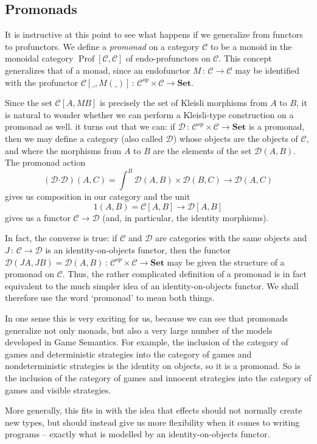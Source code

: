 \documentclass{svproc}
\newcommand\C{\mathcal{C}}
\newcommand\D{\mathcal{D}}
\newcommand\from{\,\colon\,}
\newcommand{\pfc}{\boldsymbol{\cdot}}
\newcommand{\catname}[1]{\mathbf{#1}}
\newcommand{\Set}{\catname{Set}}
\DeclareMathOperator{\Prof}{Prof}
\begin{document}
\subsection{Promonads}

It is instructive at this point to see what happens if we generalize from functors to profunctors.  
We define a \emph{promonad} on a category $\C$ to be a monoid in the monoidal category $\Prof[\C,\C]$ of endo-profunctors on $\C$.  
This concept generalizes that of a monad, since an endofunctor $M\from \C\to\C$ may be identified with the profunctor $\C[\_,M(\_)]\from \C^{op}\times\C\to\Set$.

Since the set $\C[A,MB]$ is precisely the set of Kleisli morphisms from $A$ to $B$, it is natural to wonder whether we can perform a Kleisli-type construction on a promonad as well.  
it turns out that we can: if $\D\from \C^{op}\times\C\to\Set$ is a promonad, then we may define a category (also called $\D$) whose objects are the objects of $\C$, and where the morphisms from $A$ to $B$ are the elements of the set $\D(A,B)$.
The promonad action
\[
  (\D\pfc\D)(A,C) = \int^{B}\D(A,B)\times\D(B,C) \to \D(A,C)
  \]
gives us composition in our category and the unit
\[
  1(A,B)=\C[A,B]\to \D[A,B]
  \]
gives us a functor $\C\to\D$ (and, in particular, the identity morphisms).

In fact, the converse is true: if $\C$ and $\D$ are categories with the same objects and $J\from \C\to\D$ is an identity-on-objects functor, then the functor $\D(JA,JB)=\D(A,B)\from\C^{op}\times\C\to\Set$ may be given the structure of a promonad on $\C$.  
Thus, the rather complicated definition of a promonad is in fact equivalent to the much simpler idea of an identity-on-objects functor.
We shall therefore use the word `promonad' to mean both things.

In one sense this is very exciting for us, because we can see that promonads generalize not only monads, but also a very large number of the models developed in Game Semantics.  
For example, the inclusion of the category of games and deterministic strategies into the category of games and nondeterministic strategies is the identity on objects, so it is a promonad.  
So is the inclusion of the category of games and innocent strategies into the category of games and visible strategies.  

More generally, this fits in with the idea that effects should not normally create new types, but should instead give us more flexibility when it comes to writing programs -- exactly what is modelled by an identity-on-objects functor.
\end{document}
